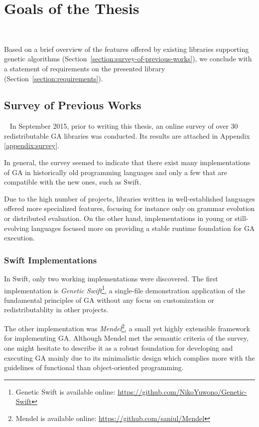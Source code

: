 \chapter{Goals of the Thesis}~\label{chapter:feature-analysis}

Based on a brief overview of the features offered by existing libraries supporting genetic algorithms (Section~\ref{section:survey-of-previous-works}), we conclude with a statement of requirements on the presented library (Section~\ref{section:requirements}).

\section{Survey of Previous Works}~\label{section:survey-of-previous-works}
In September 2015, prior to writing this thesis, an online survey of over 30 redistributable GA libraries was conducted. Its results are attached in Appendix \ref{appendix:survey}.

In general, the survey seemed to indicate that there exist many implementations of GA in historically old programming languages and only a few that are compatible with the new ones, such as Swift.

Due to the high number of projects, libraries written in well-established languages offered more specialized features, focusing for instance only on grammar evolution or distributed evaluation. On the other hand, implementations in young or still-evolving languages focused more on providing a stable runtime foundation for GA execution.

\subsection{Swift Implementations}
In Swift, only two working implementations were discovered. The first implementation is \textit{Genetic Swift}\footnote{Genetic Swift is available online: \url{https://github.com/NikoYuwono/Genetic-Swift}}, a single-file demonstration application of the fundamental principles of GA without any focus on customization or redistributablity in other projects.

The other implementation was \textit{Mendel}\footnote{Mendel is available online: \url{https://github.com/saniul/Mendel}}, a small yet highly extensible framework for implementing GA. Although Mendel met the semantic criteria of the survey, one might hesitate to describe it as a robust foundation for developing and executing GA mainly due to its minimalistic design which complies more with the guidelines of functional than object-oriented programming.

